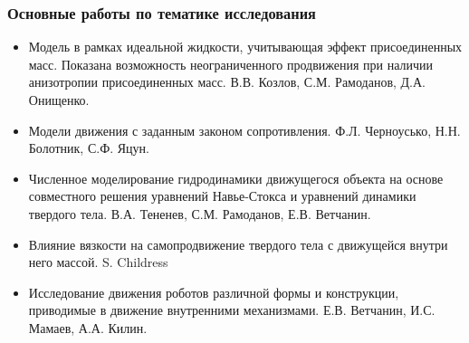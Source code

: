 \begin{frame}
\frametitle{Основные работы по тематике исследования}
	
	\begin{itemize}
		\item Модель в рамках идеальной жидкости, учитывающая эффект присоединенных масс. Показана возможность неограниченного продвижения при наличии анизотропии присоединенных масс. В.В. Козлов, С.М. Рамоданов, Д.А. Онищенко.
	\end{itemize}

		\begin{minipage}[t]{0.6\linewidth}
			\vspace{-13mm}
			\begin{itemize}
				\item Модели движения с заданным законом сопротивления. Ф.Л. Черноусько, Н.Н. Болотник, С.Ф. Яцун.
			\end{itemize}
		\end{minipage}
		\hfill
		\begin{minipage}[t]{0.30\linewidth}
		\end{minipage}	
	
	\begin{itemize}
		\item Численное моделирование гидродинамики движущегося объекта на основе совместного решения уравнений Навье-Стокса и уравнений динамики твердого тела. В.А. Тененев, С.М. Рамоданов, Е.В. Ветчанин.
		
		\item Влияние вязкости на самопродвижение твердого тела с движущейся внутри него массой. S. Childress
		
		\item Исследование движения роботов различной формы и конструкции, приводимые в движение внутренними механизмами. Е.В. Ветчанин, И.С. Мамаев, А.А. Килин.
		
		
	\end{itemize}

\end{frame}

